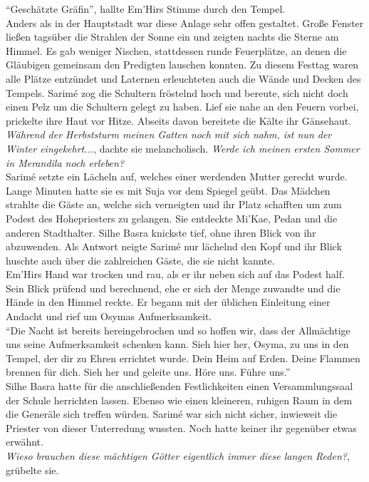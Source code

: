 ``Geschätzte Gräfin'', hallte Em'Hirs Stimme durch den Tempel.\\
Anders als in der Hauptstadt war diese Anlage sehr offen gestaltet. Große Fenster ließen tagsüber 
die Strahlen der Sonne ein und zeigten nachts die Sterne am Himmel. Es gab weniger Nischen, 
stattdessen runde Feuerplätze, an denen die Gläubigen gemeinsam den Predigten lauschen konnten. Zu 
diesem Festtag waren alle Plätze entzündet und Laternen erleuchteten auch die Wände und Decken des 
Tempels. Sarimé zog die Schultern fröstelnd hoch und bereute, sich nicht doch einen Pelz um die 
Schultern gelegt zu haben. Lief sie nahe an den Feuern vorbei, prickelte ihre Haut vor Hitze. 
Abseits davon bereitete die Kälte ihr Gänsehaut.\\
\textit{Während der Herbststurm meinen Gatten noch mit sich nahm, ist nun der Winter 
eingekehrt...}, dachte sie melancholisch. \textit{Werde ich meinen ersten Sommer in Merandila noch 
erleben?}\\
Sarimé setzte ein Lächeln auf, welches einer werdenden Mutter gerecht wurde. Lange Minuten hatte 
sie es mit Suja vor dem Spiegel geübt. Das Mädchen strahlte die Gäste an, welche sich verneigten 
und ihr Platz schafften um zum Podest des Hohepriesters zu gelangen. Sie entdeckte Mi'Kae, Pedan 
und die anderen Stadthalter. Silhe Basra knickste tief, ohne ihren Blick von ihr abzuwenden. Als 
Antwort neigte Sarimé nur lächelnd den Kopf und ihr Blick huschte auch über die zahlreichen Gäste, 
die sie nicht kannte.\\
Em'Hirs Hand war trocken und rau, als er ihr neben sich auf das Podest half. Sein Blick prüfend und 
berechnend, ehe er sich der Menge zuwandte und die Hände in den Himmel reckte. Er begann mit der 
üblichen Einleitung einer Andacht und rief um Osymas Aufmerksamkeit.\\
``Die Nacht ist bereits hereingebrochen und so hoffen wir, dass der Allmächtige uns seine 
Aufmerksamkeit schenken kann. Sieh hier her, Osyma, zu uns in den Tempel, der dir zu Ehren 
errichtet wurde. Dein Heim auf Erden. Deine Flammen brennen für dich. Sieh her und geleite uns. 
Höre uns. Führe uns.''\\
Silhe Basra hatte für die anschließenden Festlichkeiten einen Versammlungssaal der Schule 
herrichten lassen. Ebenso wie einen kleineren, ruhigen Raum in dem die Generäle sich treffen 
würden. Sarimé war sich nicht sicher, inwieweit die Priester von dieser Unterredung wussten. Noch 
hatte keiner ihr gegenüber etwas erwähnt.\\
\textit{Wieso brauchen diese mächtigen Götter eigentlich immer diese langen Reden?}, grübelte sie.\\
